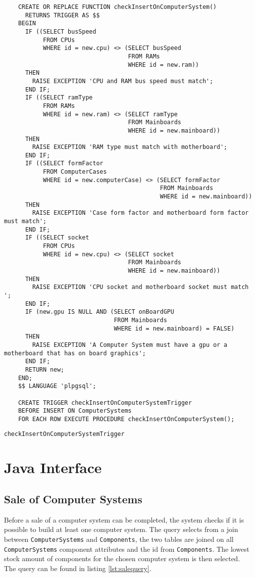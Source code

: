 \documentclass[12pt,a4paper]{article}
\begin{document}
\begin{listing}[!htbp]
	\begin{verbatim}
	CREATE OR REPLACE FUNCTION checkInsertOnComputerSystem()
	  RETURNS TRIGGER AS $$
	BEGIN
	  IF ((SELECT busSpeed
	       FROM CPUs
	       WHERE id = new.cpu) <> (SELECT busSpeed
	                               FROM RAMs
	                               WHERE id = new.ram))
	  THEN
	    RAISE EXCEPTION 'CPU and RAM bus speed must match';
	  END IF;
	  IF ((SELECT ramType
	       FROM RAMs
	       WHERE id = new.ram) <> (SELECT ramType
	                               FROM Mainboards
	                               WHERE id = new.mainboard))
	  THEN
	    RAISE EXCEPTION 'RAM type must match with motherboard';
	  END IF;
	  IF ((SELECT formFactor
	       FROM ComputerCases
	       WHERE id = new.computerCase) <> (SELECT formFactor
	                                        FROM Mainboards
	                                        WHERE id = new.mainboard))
	  THEN
	    RAISE EXCEPTION 'Case form factor and motherboard form factor must match';
	  END IF;
	  IF ((SELECT socket
	       FROM CPUs
	       WHERE id = new.cpu) <> (SELECT socket
	                               FROM Mainboards
	                               WHERE id = new.mainboard))
	  THEN
	    RAISE EXCEPTION 'CPU socket and motherboard socket must match ';
	  END IF;
	  IF (new.gpu IS NULL AND (SELECT onBoardGPU
	                           FROM Mainboards
	                           WHERE id = new.mainboard) = FALSE)
	  THEN
	    RAISE EXCEPTION 'A Computer System must have a gpu or a motherboard that has on board graphics';
	  END IF;
	  RETURN new;
	END;
	$$ LANGUAGE 'plpgsql';

	CREATE TRIGGER checkInsertOnComputerSystemTrigger
	BEFORE INSERT ON ComputerSystems
	FOR EACH ROW EXECUTE PROCEDURE checkInsertOnComputerSystem();
	\end{verbatim}
	\caption{\texttt{checkInsertOnComputerSystemTrigger}}
	\label{lst:trigger}
\end{listing}

\section{Java Interface}

\subsection{Sale of Computer Systems}
Before a sale of a computer system can be completed, the system checks if it is possible to build at least one computer system. 
The query selects from a join between \texttt{ComputerSystems} and \texttt{Components}, the two tables are joined on all \texttt{ComputerSystems} component attributes and the id from \texttt{Components}. 
The lowest stock amount of components for the chosen computer system is then selected. 
The query can be found in listing \ref{lst:salequery}.
\end{document}

